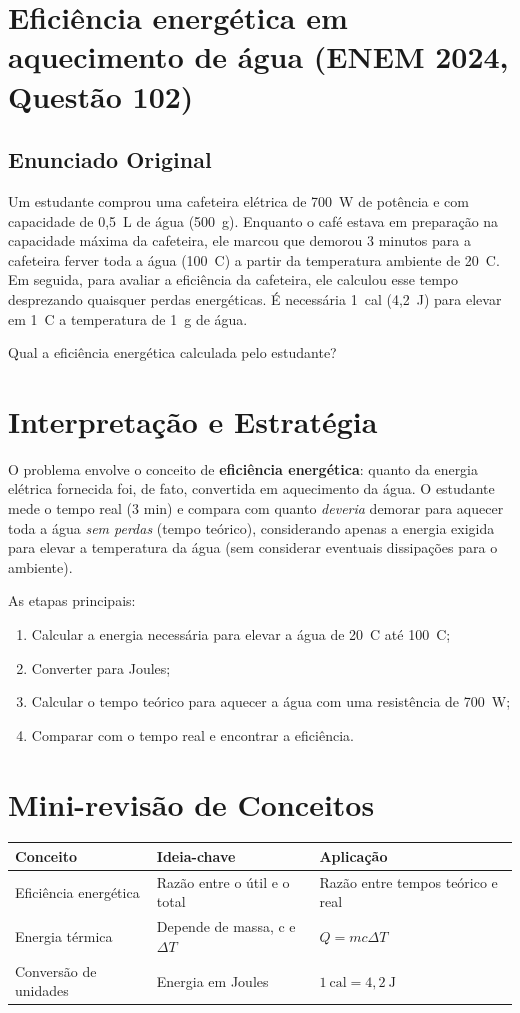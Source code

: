 \documentclass{article}
\begin{document}
\section*{Eficiência energética em aquecimento de água (ENEM 2024, Questão 102)}

\subsection*{Enunciado Original}
Um estudante comprou uma cafeteira elétrica de 700~W de potência e com capacidade de 0,5~L de água (500~g). Enquanto o café estava em preparação na capacidade máxima da cafeteira, ele marcou que demorou 3 minutos para a cafeteira ferver toda a água (100~\textdegree C) a partir da temperatura ambiente de 20~\textdegree C. Em seguida, para avaliar a eficiência da cafeteira, ele calculou esse tempo desprezando quaisquer perdas energéticas. É necessária 1~cal (4,2~J) para elevar em 1~\textdegree C a temperatura de 1~g de água.\par
Qual a eficiência energética calculada pelo estudante?

\section*{Interpretação e Estratégia}
O problema envolve o conceito de \textbf{eficiência energética}: quanto da energia elétrica fornecida foi, de fato, convertida em aquecimento da água. O estudante mede o tempo real (3 min) e compara com quanto \textit{deveria} demorar para aquecer toda a água \textit{sem perdas} (tempo teórico), considerando apenas a energia exigida para elevar a temperatura da água (sem considerar eventuais dissipações para o ambiente).

\noindent
As etapas principais:
\begin{enumerate}
    \item Calcular a energia necessária para elevar a água de 20~\textdegree C até 100~\textdegree C;
    \item Converter para Joules;
    \item Calcular o tempo teórico para aquecer a água com uma resistência de 700~W;
    \item Comparar com o tempo real e encontrar a eficiência.
\end{enumerate}

\section*{Mini-revisão de Conceitos}
\begin{tabular}{|l|l|l|}
    \hline
    \textbf{Conceito} & \textbf{Ideia-chave} & \textbf{Aplicação} \\
    \hline
    Eficiência energética & Razão entre o útil e o total & Razão entre tempos teórico e real \\
    Energia térmica & Depende de massa, c e $\Delta T$ & $Q = m c \Delta T$ \\
    Conversão de unidades & Energia em Joules & $1~\mathrm{cal} = 4,2~\mathrm{J}$ \\
    \hline
\end{tabular}
\end{document}
